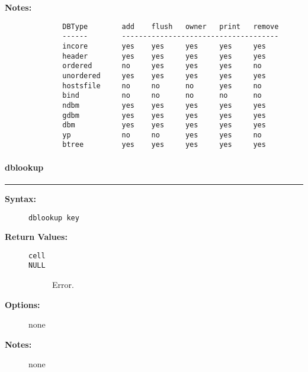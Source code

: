 \begin{description}
\begin{description}
\end{description}


\item[{\bf Notes:}] \mbox{}

\begin{verbatim}
        DBType        add    flush   owner   print   remove
        ------        -------------------------------------
        incore        yes    yes     yes     yes     yes
        header        yes    yes     yes     yes     yes
        ordered       no     yes     yes     yes     no
        unordered     yes    yes     yes     yes     yes
        hostsfile     no     no      no      yes     no
        bind          no     no      no      no      no
        ndbm          yes    yes     yes     yes     yes
        gdbm          yes    yes     yes     yes     yes
        dbm           yes    yes     yes     yes     yes
        yp            no     no      yes     yes     no
        btree         yes    yes     yes     yes     yes
\end{verbatim}


\end{description}


\vspace {2pt}


\paragraph{dblookup}

\hrule
\begin{description}
\item[{\bf Syntax:}] \mbox{}

{\tt dblookup key}

\item[{\bf Return Values:}] \mbox{}

\begin{description}
\item[{\tt cell}] \mbox{}



\item[{\tt NULL}] \mbox{}

Error.  

\end{description}


\item[{\bf Options:}] \mbox{}

none

\item[{\bf Notes:}] \mbox{}

none

\end{description}


